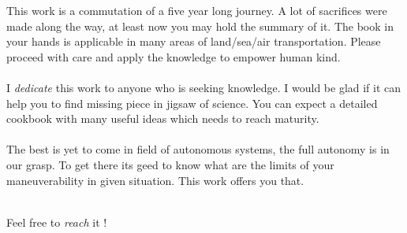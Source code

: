 \setcounter{chapter}{0}
\setcounter{section}{0}
\setcounter{subsection}{0}

\setcounter{chapter}{1}
\setcounter{section}{1}

\noindent This work is a commutation of a five year long journey. A lot of sacrifices were made along the way, at least now you may hold the summary of it. The book in your hands is applicable in many areas of land/sea/air transportation. Please proceed with care and apply the knowledge to empower human kind.  
\\ \\
I \emph{dedicate} this work to anyone who is seeking knowledge. I would be glad if it can help you to find missing piece in jigsaw of science. You can expect a detailed cookbook with many useful ideas which needs to reach maturity. 
\\\\
The best is yet to come in field of autonomous systems, the full autonomy is in our grasp. To get there its geed to know what are the limits of your maneuverability in given situation. This work offers you that.
\\ 
\\
\begin{flushright}
Feel free to \emph{reach} it !
\end{flushright}

